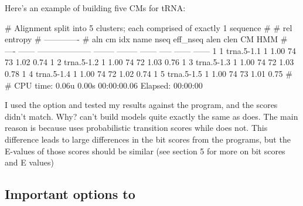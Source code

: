 Here's an example of building five  CMs for tRNA:

{\samepage
{}

\begin{sreoutput}
# Alignment split into 5 clusters; each comprised of exactly 1 sequence
#
#                                                                  rel entropy 
#                                                                 -------------
# aln  cm idx name                     nseq eff_nseq   alen  clen     CM    HMM
# ---- ------ -------------------- -------- -------- ------ ----- ------ ------
     1      1 trna.5-1.1                  1     1.00     74    73   1.02   0.74
     1      2 trna.5-1.2                  1     1.00     74    72   1.03   0.76
     1      3 trna.5-1.3                  1     1.00     74    72   1.03   0.78
     1      4 trna.5-1.4                  1     1.00     74    72   1.02   0.74
     1      5 trna.5-1.5                  1     1.00     74    73   1.01   0.75
#
# CPU time: 0.06u 0.00s 00:00:00.06 Elapsed: 00:00:00
\end{sreoutput}
}
\begin{srefaq}{I used the  option and tested my
results against the  program, and the scores didn't
match. Why?}  can't build models quite exactly the
  same as  does. The main reason is because
  \software uses probabilistic transition scores while
   does not. This difference leads to large
  differences in the bit scores from the programs, but the E-values of
  those scores should be similar (see section 5 for more on bit scores
  and E values)
\end{srefaq}

\newpage
\subsection{Important options to }

